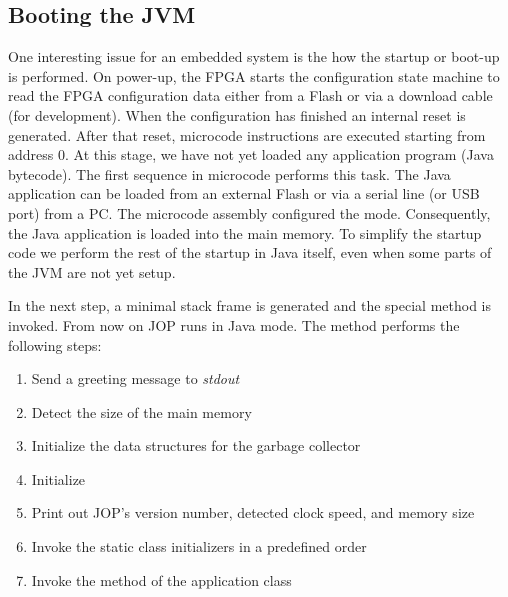 \subsection{Booting the JVM}

One interesting issue for an embedded system is the how the startup
or boot-up is performed. On power-up, the FPGA starts the
configuration state machine to read the FPGA configuration data
either from a Flash or via a download cable (for development). When
the configuration has finished an internal reset is generated. After
that reset, microcode instructions are executed starting from
address 0. At this stage, we have not yet loaded any application
program (Java bytecode). The first sequence in microcode performs
this task. The Java application can be loaded from an external Flash
or via a serial line (or USB port) from a PC. The microcode assembly
configured the mode. Consequently, the Java application is loaded
into the main memory. To simplify the startup code we perform the
rest of the startup in Java itself, even when some parts of the JVM
are not yet setup.

In the next step, a minimal stack frame is generated and the special
method  is invoked. From now on JOP runs in
Java mode. The method  performs the following steps:
\begin{samepage}
\begin{enumerate}
    \item Send a greeting message to \emph{stdout}
    \item Detect the size of the main memory
    \item Initialize the data structures for the garbage collector
    \item Initialize 
    \item Print out JOP's version number, detected clock speed, and
    memory size
    \item Invoke the static class initializers in a predefined order
    \item Invoke the  method of the application class
\end{enumerate}
\end{samepage}


